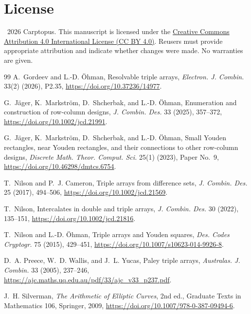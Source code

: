 \documentclass[11pt]{article}
\theoremstyle{definition}
\theoremstyle{remark}
\begin{document}
\section*{License}
\textcopyright\ 2026 Carptopus.  This manuscript is licensed under the
\href{https://creativecommons.org/licenses/by/4.0/}{Creative Commons
Attribution 4.0 International License (CC BY 4.0)}.  Reusers must provide
appropriate attribution and indicate whether changes were made.  No
warranties are given.

\begingroup
\small
\begin{thebibliography}{99}
A.~Gordeev and L.-D. \"Ohman,
Resolvable triple arrays,
\emph{Electron. J. Combin.} 33(2) (2026), P2.35,
\url{https://doi.org/10.37236/14977}.

G.~J\"ager, K.~Markstr\"om, D.~Shcherbak, and L.-D. \"Ohman,
Enumeration and construction of row-column designs,
\emph{J. Combin. Des.} 33 (2025), 357--372,
\url{https://doi.org/10.1002/jcd.21991}.

G.~J\"ager, K.~Markstr\"om, D.~Shcherbak, and L.-D. \"Ohman,
Small Youden rectangles, near Youden rectangles, and their connections to
other row-column designs,
\emph{Discrete Math. Theor. Comput. Sci.} 25(1) (2023), Paper No.~9,
\url{https://doi.org/10.46298/dmtcs.6754}.

T.~Nilson and P.~J. Cameron,
Triple arrays from difference sets,
\emph{J. Combin. Des.} 25 (2017), 494--506,
\url{https://doi.org/10.1002/jcd.21569}.

T.~Nilson,
Intercalates in double and triple arrays,
\emph{J. Combin. Des.} 30 (2022), 135--151,
\url{https://doi.org/10.1002/jcd.21816}.

T.~Nilson and L.-D. \"Ohman,
Triple arrays and Youden squares,
\emph{Des. Codes Cryptogr.} 75 (2015), 429--451,
\url{https://doi.org/10.1007/s10623-014-9926-8}.

D.~A. Preece, W.~D. Wallis, and J.~L. Yucas,
Paley triple arrays,
\emph{Australas. J. Combin.} 33 (2005), 237--246,
\url{https://ajc.maths.uq.edu.au/pdf/33/ajc_v33_p237.pdf}.

J.~H. Silverman,
\emph{The Arithmetic of Elliptic Curves}, 2nd ed., Graduate Texts in
Mathematics 106, Springer, 2009,
\url{https://doi.org/10.1007/978-0-387-09494-6}.
\end{thebibliography}
\endgroup
\end{document}
